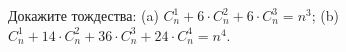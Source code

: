 Докажите тождества: (a) $C_n^1 + 6 \cdot C_n^2 + 6 \cdot C_n^3 = n^3$; (b) $C_n^1 + 14 \cdot C_n^2 + 36 \cdot C_n^3 + 24 \cdot C_n^4 = n^4$.